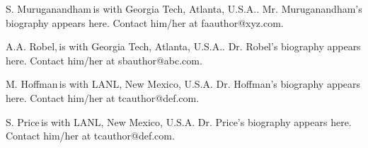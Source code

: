 \begin{IEEEbiography}{S. Muruganandham}{\,}is with Georgia Tech, Atlanta, U.S.A.. Mr. Muruganandham's biography appears here.  Contact him/her at faauthor@xyz.com.
\end{IEEEbiography}

\begin{IEEEbiography}{A.A. Robel,}{\,}is with Georgia Tech, Atlanta, U.S.A.. Dr. Robel's biography appears here.  Contact him/her at sbauthor@abc.com.
\end{IEEEbiography}

\begin{IEEEbiography}{M. Hoffman}{\,}is with LANL, New Mexico, U.S.A. Dr. Hoffman's biography appears here.  Contact him/her at tcauthor@def.com.
\end{IEEEbiography}

\begin{IEEEbiography}{S. Price}{\,}is with LANL, New Mexico, U.S.A. Dr. Price's biography appears here.  Contact him/her at tcauthor@def.com.
\end{IEEEbiography}
